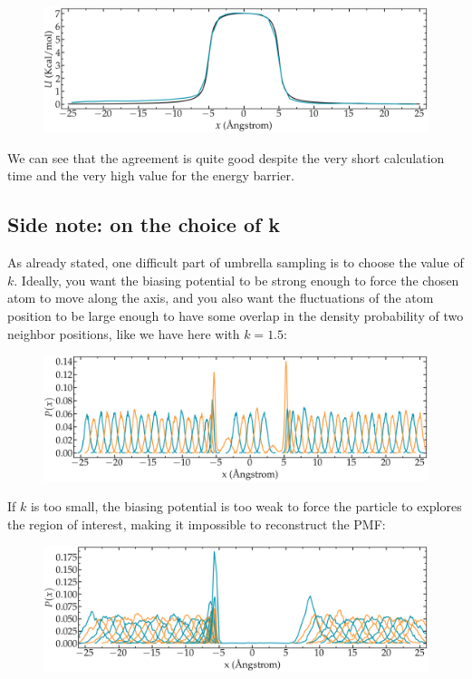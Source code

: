 \begin{figure}
\includegraphics[width=\linewidth]{tutorials/level3/free-energy-calculation/freeenergy-light.png}
\end{figure}

We can see that the agreement is quite good despite the very short calculation time
and the very high value for the energy barrier. 

\subsection{Side note: on the choice of k}

\noindent As already stated, one difficult part of umbrella sampling is to choose the value of $k$.
Ideally, you want the biasing potential to be strong enough to force
the chosen atom to move along the axis, and you also want the
fluctuations of the atom position to be large enough to
have some overlap in the density probability of two
neighbor positions, like we have here with $k = 1.5$:

\begin{figure}
\includegraphics[width=\linewidth]{tutorials/level3/free-energy-calculation/overlap-light.png}
\end{figure}

If $k$ is too small, the biasing potential is too weak to force the particle to explores the 
region of interest, making it impossible to reconstruct the PMF:

\begin{figure}
\includegraphics[width=\linewidth]{tutorials/level3/free-energy-calculation/overlap015-light.png}
\end{figure}

